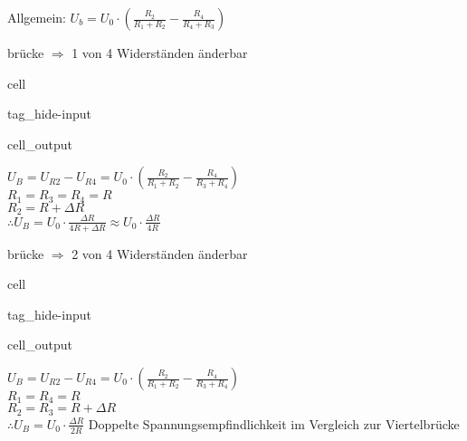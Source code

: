 \documentclass[letterpaper,10pt,english]{jupyterBook}
\begin{document}
\sphinxAtStartPar
Allgemein:
\(U_b = U_0 \cdot \left(\frac{R_2}{R_1 + R_2} - \frac{R_4}{R_4+R_3}\right)\)

\begin{DUlineblock}{0em}
\item[] 
\end{DUlineblock}

\sphinxAtStartPar
{}brücke \(\Rightarrow\) 1 von 4 Widerständen änderbar

\begin{sphinxuseclass}{cell}
\begin{sphinxuseclass}{tag_hide-input}\begin{sphinxVerbatimOutput}

\begin{sphinxuseclass}{cell_output}
\noindent{}

\end{sphinxuseclass}\end{sphinxVerbatimOutput}

\end{sphinxuseclass}
\end{sphinxuseclass}
\sphinxAtStartPar
\(U_B = U_{R2} - U_{R4} = U_0 \cdot \left( \frac{R_2}{R_1 + R_2} - \frac{R_4}{R_3 + R_4} \right)\)\\
\(R_1 = R_3 = R_4 = R\)\\
\(R_2 = R + \Delta R\)\\
\(\therefore U_B = U_0 \cdot \frac{\Delta R}{4R + \Delta R} \approx U_0 \cdot \frac{\Delta R}{4R}\)

\begin{DUlineblock}{0em}
\item[] 
\end{DUlineblock}

\sphinxAtStartPar
{}brücke \(\Rightarrow\) 2 von 4 Widerständen änderbar

\begin{sphinxuseclass}{cell}
\begin{sphinxuseclass}{tag_hide-input}\begin{sphinxVerbatimOutput}

\begin{sphinxuseclass}{cell_output}
\noindent{}

\end{sphinxuseclass}\end{sphinxVerbatimOutput}

\end{sphinxuseclass}
\end{sphinxuseclass}
\sphinxAtStartPar
\(U_B = U_{R2} - U_{R4} = U_0 \cdot \left( \frac{R_2}{R_1 + R_2} - \frac{R_4}{R_3 + R_4} \right)\)\\
\(R_1 = R_4 = R\)\\
\(R_2 = R_3 = R + \Delta R\)\\
\(\therefore U_B = U_0 \cdot \frac{\Delta R}{2R}\)
Doppelte Spannungsempfindlichkeit im Vergleich zur Viertelbrücke
\end{document}
